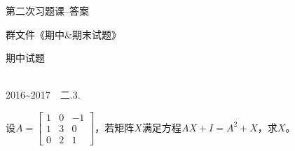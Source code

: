 \documentclass{article}
\begin{document}
 \renewcommand{\thenum}{\arabic{num}.} \newcommand{\num}{\refstepcounter{num}\text{\thenum}}

\newenvironment{jie}{\kaishu\zihao{-5}\color{blue}{\noindent\em 解：}\par}{\hfill $\diamondsuit$\par}

\hphantom{~~}\hfill {\heiti 第二次习题课--答案} \hfill\hphantom{~~}

\hphantom{~~}\hfill {\heiti 群文件《期中$\&$期末试题》} \hfill\hphantom{~~}


{\heiti {} 期中试题}

{\heiti {} ~}\\

2016\~{}2017~~二.3.

设$
A=
\begin{bmatrix}
  1& 0 &-1 \\
  1&3&0\\
  0&2&1
\end{bmatrix}
$，若矩阵$X$满足方程$AX+I=A^{2}+X$，求$X$。
\end{document}

